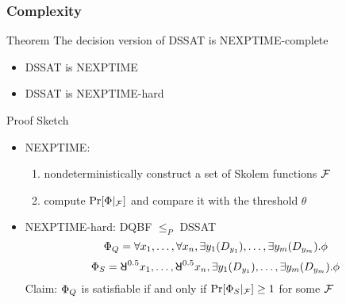 \begin{frame}
  \frametitle{Complexity}
  \begin{block}{Theorem}
    The decision version of DSSAT is NEXPTIME-complete
    \pause
    \begin{itemize}
      \item DSSAT is NEXPTIME
            \pause
      \item DSSAT is NEXPTIME-hard
    \end{itemize}
  \end{block}
  \pause
  \begin{block}{Proof Sketch}
    \belowdisplayskip=0pt
    \begin{itemize}
      \item NEXPTIME:
            \pause
            \begin{enumerate}
              \item nondeterministically construct a set of Skolem functions $\mathcal{F}$
                    \pause
              \item compute $\Pr[\Phi|_{\mathcal{F}}]$ and compare it with the threshold $\theta$
            \end{enumerate}
            \pause
      \item NEXPTIME-hard: DQBF $\leq_P$ DSSAT
            \pause
            \begin{equation*}
              \Phi_Q=\forall x_1, \ldots, \forall x_n, \exists y_1(D_{y_1}), \ldots, \exists y_m(D_{y_m}).\phi
            \end{equation*}
            \pause
            \begin{equation*}
              \Qf_S=\random{0.5} x_1, \ldots, \random{0.5} x_n, \exists y_1(D_{y_1}), \ldots, \exists y_m(D_{y_m}).\pf
            \end{equation*}
            \pause
            Claim: $\Phi_Q$ is satisfiable if and only if $\Pr[\Phi_S|_{\mathcal{F}}] \geq 1$ for some $\mathcal{F}$
    \end{itemize}
  \end{block}
\end{frame}